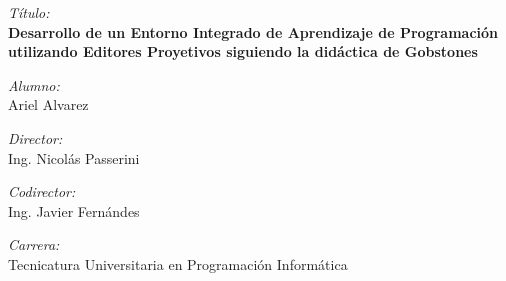 \Large \emph{Título:}\\
\textbf{Desarrollo de un Entorno Integrado de Aprendizaje de Programación utilizando Editores Proyetivos siguiendo la didáctica de Gobstones}
\bigskip

\Large \emph{Alumno:}\\
Ariel Alvarez
\bigskip

\Large \emph{Director:}\\
Ing. Nicolás Passerini
\bigskip

\Large \emph{Codirector:}\\
Ing. Javier Fernándes
\bigskip


\Large \emph{Carrera:}\\
Tecnicatura Universitaria en Programación Informática
